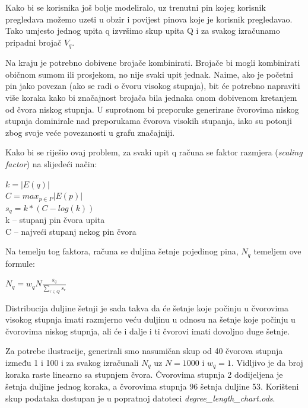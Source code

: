 \documentclass[times, utf8, seminar]{fer}
\begin{document}
Kako bi se korisnika još bolje modeliralo, uz trenutni pin kojeg korisnik pregledava možemo uzeti u obzir i povijest pinova koje je korisnik pregledavao. Tako umjesto jednog upita q izvršimo skup upita Q i za svakog izračunamo pripadni brojač $V_q$.

Na kraju je potrebno dobivene brojače kombinirati. Brojače bi mogli kombinirati običnom sumom ili prosjekom, no nije svaki upit jednak. Naime, ako je početni pin jako povezan (ako se radi o čvoru visokog stupnja), bit će potrebno napraviti više koraka kako bi značajnost brojača bila jednaka onom dobivenom kretanjem od čvora niskog stupnja. U suprotnom bi preporuke generirane čvorovima niskog stupnja dominirale nad preporukama čvorova visokih stupanja, iako su potonji zbog svoje veće povezanosti u grafu značajniji.

Kako bi se riješio ovaj problem, za svaki upit q računa se faktor razmjera (\textit{scaling factor}) na slijedeći način:

\begin{centering}
		  $ k = |E(q)| $ \\
		  $ C = max_{p \in P}|E(p)| $ \\
		  $ s_q = k * (C - log(k)) $ \\
        k -- stupanj pin čvora upita \\
		  C -- najveći stupanj nekog pin čvora 
		  \par
\end{centering}

Na temelju tog faktora, računa se duljina šetnje pojedinog pina, $N_q$ temeljem ove formule:

\begin{centering}
	$ N_q = w_qN\frac{s_q}{\sum_{r \in Q}s_r} $\par
\end{centering}

Distribucija duljine šetnji je sada takva da će šetnje koje počinju u čvorovima visokog stupnja imati razmjerno veću duljinu u odnosu na šetnje koje počinju u čvorovima niskog stupnja, ali će i dalje i ti čvorovi imati dovoljno duge šetnje.

Za potrebe ilustracije, generirali smo nasumičan skup od 40 čvorova stupnja između 1 i 100 i za svakog izračunali $N_q$ uz $N = 1000$ i $w_q = 1$. Vidljivo je da broj koraka raste linearno sa stupnjem čvora. Čvorovima stupnja 2 dodijeljena je šetnja duljine jednog koraka, a čvorovima stupnja 96 šetnja duljine 53. Korišteni skup podataka dostupan je u popratnoj datoteci \textit{degree\_length\_chart.ods}.
\end{document}
